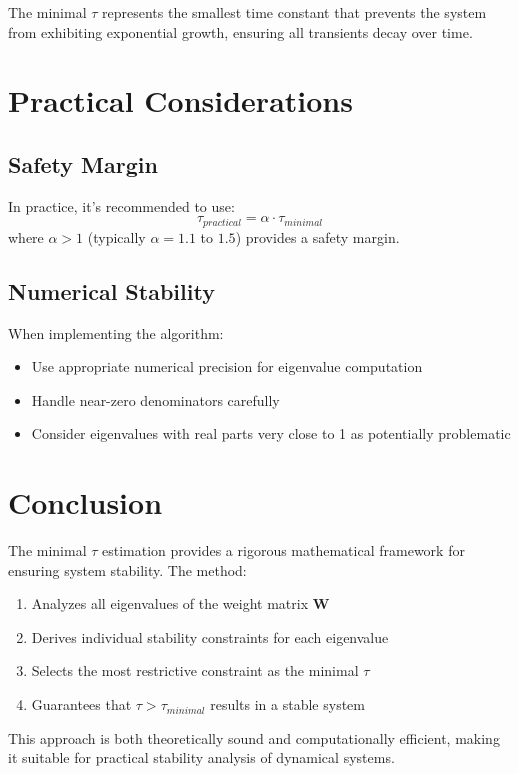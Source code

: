 \documentclass[11pt]{article}
\begin{document}
The minimal $\tau$ represents the smallest time constant that prevents the system from exhibiting exponential growth, ensuring all transients decay over time.

\section{Practical Considerations}

\subsection{Safety Margin}
In practice, it's recommended to use:
\begin{equation}
\tau_{practical} = \alpha \cdot \tau_{minimal}
\end{equation}
where $\alpha > 1$ (typically $\alpha = 1.1$ to $1.5$) provides a safety margin.

\subsection{Numerical Stability}
When implementing the algorithm:
\begin{itemize}
    \item Use appropriate numerical precision for eigenvalue computation
    \item Handle near-zero denominators carefully
    \item Consider eigenvalues with real parts very close to 1 as potentially problematic
\end{itemize}

\section{Conclusion}

The minimal $\tau$ estimation provides a rigorous mathematical framework for ensuring system stability. The method:
\begin{enumerate}
    \item Analyzes all eigenvalues of the weight matrix $\mathbf{W}$
    \item Derives individual stability constraints for each eigenvalue
    \item Selects the most restrictive constraint as the minimal $\tau$
    \item Guarantees that $\tau > \tau_{minimal}$ results in a stable system
\end{enumerate}

This approach is both theoretically sound and computationally efficient, making it suitable for practical stability analysis of dynamical systems.
\end{document}

